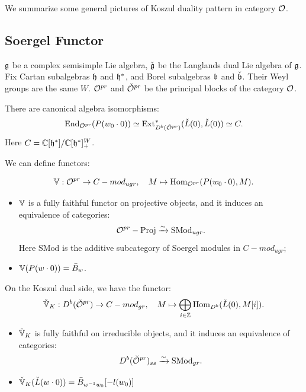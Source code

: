 
We summarize some general pictures of Koszul duality pattern in category $\mathcal{O}$.

\subsection{Soergel Functor}

$\mathfrak{g}$ be a complex semisimple Lie algebra, $\check{\mathfrak{g}}$ be the Langlands dual Lie algebra of $\mathfrak{g}$. Fix Cartan subalgebras $\mathfrak{h}$ and $\mathfrak{h}^*$, and Borel subalgebras $\mathfrak{b}$ and $\check{\mathfrak{b}}$. Their Weyl groups are the same $W$. $\mathcal{O}^{pr}$ and $\check{\mathcal{O}}^{pr}$ be the principal blocks of the category $\mathcal{O}$.

\begin{thm}
  There are canonical algebra isomorphisms:
  \[
    \operatorname{End}_{\mathcal{O}^{pr}}(P(w_0 \cdot 0)) \simeq \mathrm{Ext}^*_{D^b(\check{\mathcal{O}}^{pr})}(\check{L}(0),\check{L}(0)) \simeq C.
  \]
  Here $C = \mathbb{C}[\mathfrak{h}^*]/\mathbb{C}[\mathfrak{h}^*]^{W}_{+}$.
\end{thm}

We can define functors:

\[
  \mathbb{V}: \mathcal{O}^{pr} \to C-mod_{ugr}, \quad M \mapsto \operatorname{Hom}_{\mathcal{O}^{pr}}(P(w_0 \cdot 0),M).
\]

\begin{thm}
  \begin{itemize}
    \item $\mathbb{V}$ is a fully faithful functor on projective objects, and it induces an equivalence of categories:
  \[
    \mathcal{O}^{pr}-\mathrm{Proj} \xrightarrow{\sim} \mathrm{SMod}_{ugr}.
  \]
  Here $\mathrm{SMod}$ is the additive subcategory of Soergel modules in $C-mod_{ugr}$;
    \item $\mathbb{V}(P(w \cdot 0)) = \bar{B}_w$.
  \end{itemize}
  
\end{thm}

On the Koszul dual side, we have the functor:
\[
  \check{\mathbb{V}}_K: D^b(\check{\mathcal{O}}^{pr}) \to C-mod_{gr}, \quad M \mapsto \bigoplus_{i \in \mathbb{Z}} \operatorname{Hom}_{D^b}(\check{L}(0),M[i]).
\]

\begin{thm}
  \begin{itemize}
    \item $\check{\mathbb{V}}_K$ is fully faithful on irreducible objects, and it induces an equivalence of categories:
  \[
    D^b(\check{\mathcal{O}}^{pr})_{ss}  \xrightarrow{\sim} \mathrm{SMod}_{gr}.
  \]
  \item $\check{\mathbb{V}}_K(\check{L}(w \cdot 0)) = \bar{B}_{w^{-1}w_0}[-l(w_0)]$
  \end{itemize}
  
\end{thm}


